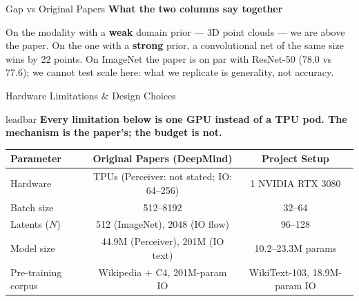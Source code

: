 \documentclass[aspectratio=169,11pt]{beamer}
\newcommand{\lead}[1]{%
  \begin{beamercolorbox}[wd=\textwidth,sep=5pt,center]{leadbar}%
    \small\bfseries #1%
  \end{beamercolorbox}\vspace{0.6em}}
\newcommand{\colhead}[1]{{\color{HeadBlue}\bfseries #1}\par\vspace{0.25em}}
\begin{document}
\begin{frame}[shrink=28]{Gap vs Original Papers}
  \vspace{0.5em}
  \colhead{What the two columns say together}
    On the modality with a \textbf{weak} domain prior --- 3D point clouds --- we are above the paper. On the one with a \textbf{strong} prior, a convolutional net of the same size wins by 22 points. On ImageNet the paper is on par with ResNet-50 (78.0 vs 77.6); we cannot test scale here: what we replicate is \alert{generality}, not accuracy.
  
\end{frame}

\begin{frame}[shrink=14]{Hardware Limitations \& Design Choices}
  \lead{Every limitation below is one GPU instead of a TPU pod. The mechanism is the paper's; the budget is not.}
  \begin{table}
    \centering\small
    \begin{tabular}{lcc}
      \toprule
      \textbf{Parameter} & \textbf{Original Papers (DeepMind)} & \textbf{Project Setup} \\
      \midrule
      Hardware & TPUs (Perceiver: not stated; IO: 64--256) & 1 NVIDIA RTX 3080 \\
      Batch size & 512--8192 & 32--64 \\
      Latents ($N$) & 512 (ImageNet), 2048 (IO flow) & 96--128 \\
      Model size & 44.9M (Perceiver), 201M (IO text) & 10.2--23.3M params \\
      Pre-training corpus & Wikipedia $+$ C4, 201M-param IO & WikiText-103, 18.9M-param IO \\
      \bottomrule
    \end{tabular}
  \end{table}


\end{frame}
\end{document}
